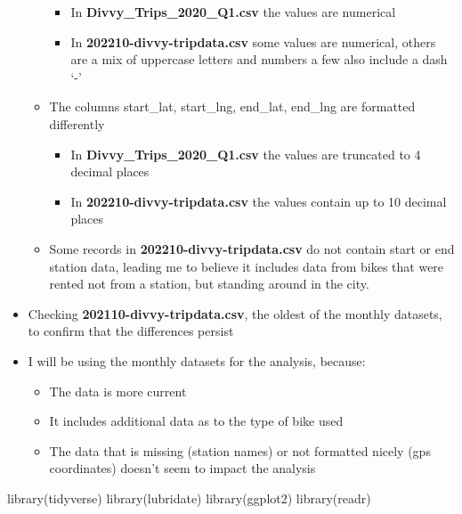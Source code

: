 \documentclass[
]{article}
\newenvironment{Shaded}{\begin{snugshade}}{\end{snugshade}}
\newcommand{\FunctionTok}[1]{\textcolor[rgb]{0.00,0.00,0.00}{#1}}
\newcommand{\NormalTok}[1]{#1}
\providecommand{\tightlist}{%
  \setlength{\itemsep}{0pt}\setlength{\parskip}{0pt}}
\begin{document}
\begin{itemize}
\begin{itemize}
    \begin{itemize}
    \tightlist
    \item
      In \textbf{Divvy\_Trips\_2020\_Q1.csv} the values are numerical
    \item
      In \textbf{202210-divvy-tripdata.csv} some values are numerical,
      others are a mix of uppercase letters and numbers a few also
      include a dash `-'
    \end{itemize}
  \item
    The columns start\_lat, start\_lng, end\_lat, end\_lng are formatted
    differently

    \begin{itemize}
    \tightlist
    \item
      In \textbf{Divvy\_Trips\_2020\_Q1.csv} the values are truncated to
      4 decimal places
    \item
      In \textbf{202210-divvy-tripdata.csv} the values contain up to 10
      decimal places
    \end{itemize}
  \item
    Some records in \textbf{202210-divvy-tripdata.csv} do not contain
    start or end station data, leading me to believe it includes data
    from bikes that were rented not from a station, but standing around
    in the city.
  \end{itemize}
\item
  Checking \textbf{202110-divvy-tripdata.csv}, the oldest of the monthly
  datasets, to confirm that the differences persist
\item
  I will be using the monthly datasets for the analysis, because:

  \begin{itemize}
  \tightlist
  \item
    The data is more current
  \item
    It includes additional data as to the type of bike used
  \item
    The data that is missing (station names) or not formatted nicely
    (gps coordinates) doesn't seem to impact the analysis
  \end{itemize}
\end{itemize}

\begin{Shaded}
\begin{Highlighting}[]
\FunctionTok{library}\NormalTok{(tidyverse)}
\FunctionTok{library}\NormalTok{(lubridate)}
\FunctionTok{library}\NormalTok{(ggplot2)}
\FunctionTok{library}\NormalTok{(readr)}
\end{Highlighting}
\end{Shaded}
\end{document}
